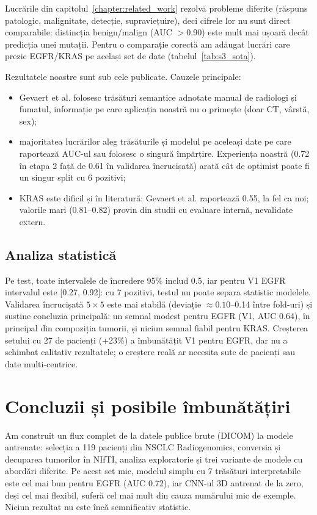 \documentclass[runningheads,a4paper,11pt]{report}
\begin{document}
Lucrările din capitolul~\ref{chapter:related_work} rezolvă probleme diferite (răspuns patologic, malignitate, detecție, supraviețuire), deci cifrele lor nu sunt direct comparabile: distincția benign/malign (AUC $>$0.90) este mult mai ușoară decât predicția unei mutații. Pentru o comparație corectă am adăugat lucrări care prezic EGFR/KRAS pe același set de date (tabelul~\ref{tab:s3_sota}).

Rezultatele noastre sunt sub cele publicate. Cauzele principale:
\begin{itemize}
    \item Gevaert et al. folosesc trăsături semantice adnotate manual de radiologi și fumatul, informație pe care aplicația noastră nu o primește (doar CT, vârstă, sex);
    \item majoritatea lucrărilor aleg trăsăturile și modelul pe aceleași date pe care raportează AUC-ul sau folosesc o singură împărțire. Experiența noastră (0.72 în etapa 2 față de 0.61 în validarea încrucișată) arată cât de optimist poate fi un singur split cu 6 pozitivi;
    \item KRAS este dificil și în literatură: Gevaert et al. raportează 0.55, la fel ca noi; valorile mari (0.81--0.82) provin din studii cu evaluare internă, nevalidate extern.
\end{itemize}

\section{Analiza statistică}
Pe test, toate intervalele de încredere 95\% includ 0.5, iar pentru V1 EGFR intervalul este [0.27, 0.92]: cu 7 pozitivi, testul nu poate separa statistic modelele. Validarea încrucișată $5\times5$ este mai stabilă (deviație $\approx 0.10$--0.14 între fold-uri) și susține concluzia principală: un semnal modest pentru EGFR (V1, AUC 0.64), în principal din compoziția tumorii, și niciun semnal fiabil pentru KRAS. Creșterea setului cu 27 de pacienți (+23\%) a îmbunătățit V1 pentru EGFR, dar nu a schimbat calitativ rezultatele; o creștere reală ar necesita sute de pacienți sau date multi-centrice.

\chapter{Concluzii și posibile îmbunătățiri}
\label{chapter:concluzii}

Am construit un flux complet de la datele publice brute (DICOM) la modele antrenate: selecția a 119 pacienți din NSCLC Radiogenomics, conversia și decuparea tumorilor în NIfTI, analiza exploratorie și trei variante de modele cu abordări diferite. Pe acest set mic, modelul simplu cu 7 trăsături interpretabile este cel mai bun pentru EGFR (AUC 0.72), iar CNN-ul 3D antrenat de la zero, deși cel mai flexibil, suferă cel mai mult din cauza numărului mic de exemple. Niciun rezultat nu este încă semnificativ statistic.
\end{document}
